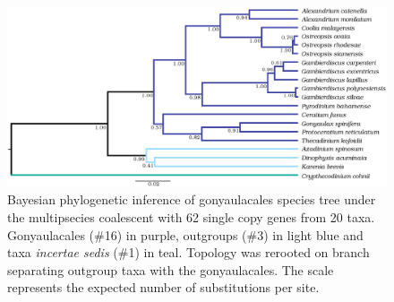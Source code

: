 \documentclass[12pt]{article}
\begin{document}
\begin{figure} 
\includegraphics[scale=.25]{figures/Aug2_20-taxa-combined-fig_MCC_trees.png} 
\caption{Bayesian phylogenetic inference of gonyaulacales species tree under the multipsecies coalescent with 62 single copy genes from 20 taxa. Gonyaulacales (\#16) in purple, outgroups (\#3) in light blue and taxa \textit{incertae sedis} (\#1) in teal. Topology was rerooted on branch separating outgroup taxa with the gonyaulacales. The scale represents the expected number of substitutions per site.} 
\label{fig:SCmscBI}
\end{figure} 
\FloatBarrier

\newpage
\end{document}
